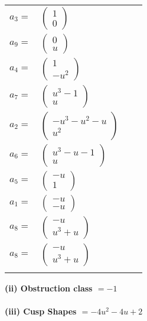 \documentclass[1p]{elsarticle_modified}
\theoremstyle{definition}
\begin{document}
\begin{tabular}{m{7pt} m{180pt} m{7pt} m{180pt} }
\flushright $a_{3}=$&$\begin{pmatrix}1\\0\end{pmatrix}$ \\
\flushright $a_{9}=$&$\begin{pmatrix}0\\u\end{pmatrix}$ \\
\flushright $a_{4}=$&$\begin{pmatrix}1\\- u^2\end{pmatrix}$ \\
\flushright $a_{7}=$&$\begin{pmatrix}u^3-1\\u\end{pmatrix}$ \\
\flushright $a_{2}=$&$\begin{pmatrix}- u^3- u^2- u\\u^2\end{pmatrix}$ \\
\flushright $a_{6}=$&$\begin{pmatrix}u^3- u-1\\u\end{pmatrix}$ \\
\flushright $a_{5}=$&$\begin{pmatrix}- u\\1\end{pmatrix}$ \\
\flushright $a_{1}=$&$\begin{pmatrix}- u\\- u\end{pmatrix}$ \\
\flushright $a_{8}=$&$\begin{pmatrix}- u\\u^3+u\end{pmatrix}$\\ \flushright $a_{8}=$&$\begin{pmatrix}- u\\u^3+u\end{pmatrix}$\\&\end{tabular}
\flushleft \textbf{(ii) Obstruction class $= -1$}\\~\\
\flushleft \textbf{(iii) Cusp Shapes $= -4 u^2-4 u+2$}\\~\\
\end{document}
